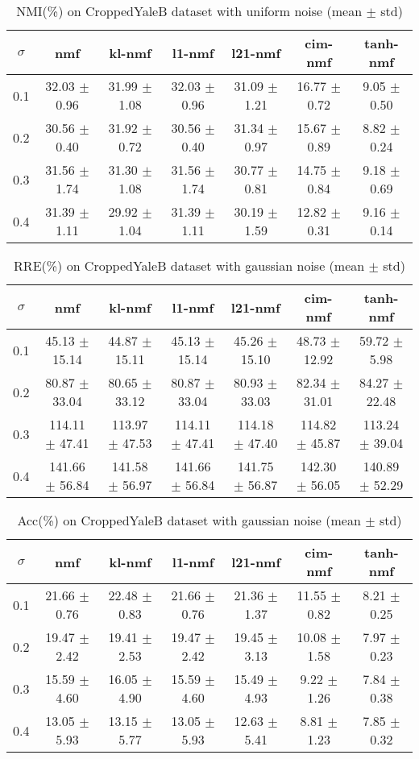 \documentclass{article} %
\begin{document}
\begin{table}
\begin{tabular}{c|cccccc}$\sigma$ & nmf & kl-nmf & l1-nmf & l21-nmf & cim-nmf & tanh-nmf \\\hline
0.1 & 32.03 $\pm$ 0.96 & 31.99 $\pm$ 1.08 & 32.03 $\pm$ 0.96 & 31.09 $\pm$ 1.21 & 16.77 $\pm$ 0.72 & 9.05 $\pm$ 0.50 \\
0.2 & 30.56 $\pm$ 0.40 & 31.92 $\pm$ 0.72 & 30.56 $\pm$ 0.40 & 31.34 $\pm$ 0.97 & 15.67 $\pm$ 0.89 & 8.82 $\pm$ 0.24 \\
0.3 & 31.56 $\pm$ 1.74 & 31.30 $\pm$ 1.08 & 31.56 $\pm$ 1.74 & 30.77 $\pm$ 0.81 & 14.75 $\pm$ 0.84 & 9.18 $\pm$ 0.69 \\
0.4 & 31.39 $\pm$ 1.11 & 29.92 $\pm$ 1.04 & 31.39 $\pm$ 1.11 & 30.19 $\pm$ 1.59 & 12.82 $\pm$ 0.31 & 9.16 $\pm$ 0.14 \\
\end{tabular}\caption{
  NMI(\%) on CroppedYaleB dataset with uniform noise (mean $\pm$ std)
  \label{tab:NMI-CroppedYaleB-uniform}
}\end{table}
\begin{table}
\begin{tabular}{c|cccccc}$\sigma$ & nmf & kl-nmf & l1-nmf & l21-nmf & cim-nmf & tanh-nmf \\\hline
0.1 & 45.13 $\pm$ 15.14 & 44.87 $\pm$ 15.11 & 45.13 $\pm$ 15.14 & 45.26 $\pm$ 15.10 & 48.73 $\pm$ 12.92 & 59.72 $\pm$ 5.98 \\
0.2 & 80.87 $\pm$ 33.04 & 80.65 $\pm$ 33.12 & 80.87 $\pm$ 33.04 & 80.93 $\pm$ 33.03 & 82.34 $\pm$ 31.01 & 84.27 $\pm$ 22.48 \\
0.3 & 114.11 $\pm$ 47.41 & 113.97 $\pm$ 47.53 & 114.11 $\pm$ 47.41 & 114.18 $\pm$ 47.40 & 114.82 $\pm$ 45.87 & 113.24 $\pm$ 39.04 \\
0.4 & 141.66 $\pm$ 56.84 & 141.58 $\pm$ 56.97 & 141.66 $\pm$ 56.84 & 141.75 $\pm$ 56.87 & 142.30 $\pm$ 56.05 & 140.89 $\pm$ 52.29 \\
\end{tabular}\caption{
  RRE(\%) on CroppedYaleB dataset with gaussian noise (mean $\pm$ std)
  \label{tab:RRE-CroppedYaleB-gaussian}
}\end{table}
\begin{table}
\begin{tabular}{c|cccccc}$\sigma$ & nmf & kl-nmf & l1-nmf & l21-nmf & cim-nmf & tanh-nmf \\\hline
0.1 & 21.66 $\pm$ 0.76 & 22.48 $\pm$ 0.83 & 21.66 $\pm$ 0.76 & 21.36 $\pm$ 1.37 & 11.55 $\pm$ 0.82 & 8.21 $\pm$ 0.25 \\
0.2 & 19.47 $\pm$ 2.42 & 19.41 $\pm$ 2.53 & 19.47 $\pm$ 2.42 & 19.45 $\pm$ 3.13 & 10.08 $\pm$ 1.58 & 7.97 $\pm$ 0.23 \\
0.3 & 15.59 $\pm$ 4.60 & 16.05 $\pm$ 4.90 & 15.59 $\pm$ 4.60 & 15.49 $\pm$ 4.93 & 9.22 $\pm$ 1.26 & 7.84 $\pm$ 0.38 \\
0.4 & 13.05 $\pm$ 5.93 & 13.15 $\pm$ 5.77 & 13.05 $\pm$ 5.93 & 12.63 $\pm$ 5.41 & 8.81 $\pm$ 1.23 & 7.85 $\pm$ 0.32 \\
\end{tabular}\caption{
  Acc(\%) on CroppedYaleB dataset with gaussian noise (mean $\pm$ std)
  \label{tab:Acc-CroppedYaleB-gaussian}
}\end{table}
\end{document}
